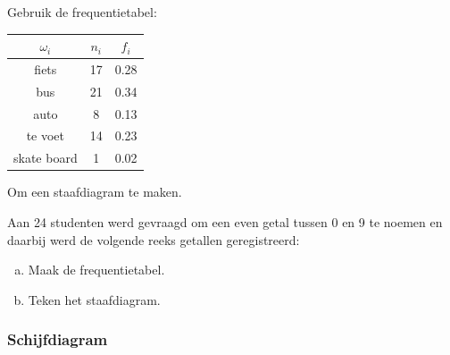 \documentclass[12pt,twoside,a4paper]{article}
\begin{document}
\begin{oefening}
Gebruik de frequentietabel:
\begin{center}
  \begin{tabular}{c|c|c}
    $\omega_i$ & $n_i$ & $f_i$\\
    \hline
    fiets      & 17    & 0.28\\
    bus        & 21    & 0.34\\
    auto       &  8    & 0.13\\
    te voet    & 14    & 0.23\\
    skate board&  1    & 0.02
  \end{tabular}
\end{center}
Om een staafdiagram te maken.
\end{oefening}

\begin{oefening}
  Aan 24 studenten werd gevraagd om een even getal tussen 0 en 9 te noemen en daarbij werd de volgende reeks getallen geregistreerd:

  \begin{center}
  \end{center}
  \begin{enumerate}[(a)]
  \item Maak de frequentietabel.
  \item Teken het staafdiagram.
\end{enumerate}
\end{oefening}

\subsubsection{Schijfdiagram}
\end{document}
